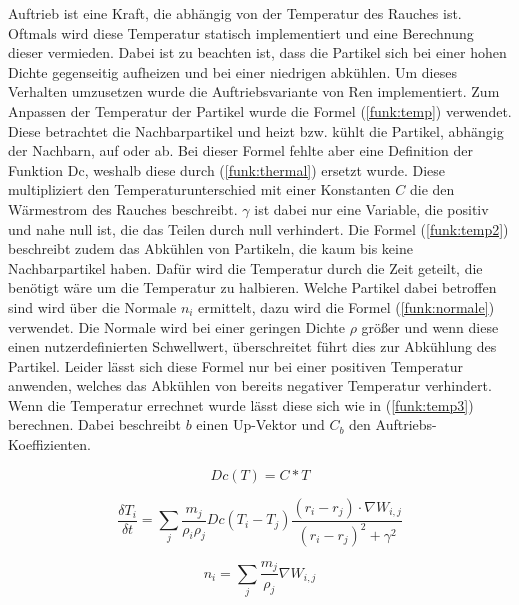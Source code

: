 \documentclass[intern,palatino]{cgBA}
\begin{document}
Auftrieb ist eine Kraft, die abhängig von der Temperatur des Rauches ist. Oftmals wird diese Temperatur statisch implementiert und eine Berechnung dieser vermieden. Dabei ist zu beachten ist, dass die Partikel sich bei einer hohen Dichte gegenseitig aufheizen und bei einer niedrigen abkühlen. Um dieses Verhalten umzusetzen wurde die Auftriebsvariante von Ren \cite{ren2016fast} implementiert.
\newline
Zum Anpassen der Temperatur der Partikel wurde die Formel (\ref{funk:temp}) verwendet. Diese betrachtet die Nachbarpartikel und heizt bzw. kühlt die Partikel, abhängig der Nachbarn, auf oder ab. Bei dieser Formel fehlte aber eine Definition der Funktion Dc, weshalb diese durch (\ref{funk:thermal}) ersetzt wurde. Diese multipliziert den Temperaturunterschied mit einer Konstanten $C$ die den Wärmestrom des Rauches beschreibt. $\gamma$ ist dabei nur eine Variable, die positiv und nahe null ist, die das Teilen durch null verhindert.
\newline
Die Formel (\ref{funk:temp2}) beschreibt zudem das Abkühlen von Partikeln, die kaum bis keine Nachbarpartikel haben. Dafür wird die Temperatur durch die Zeit geteilt, die benötigt wäre um die Temperatur zu halbieren. Welche Partikel dabei betroffen sind wird über die Normale $n_i$ ermittelt, dazu wird die Formel (\ref{funk:normale}) verwendet. Die Normale wird bei einer geringen Dichte $\rho$ größer und wenn diese einen nutzerdefinierten Schwellwert, überschreitet führt dies zur Abkühlung des Partikel. Leider lässt sich diese Formel nur bei einer positiven Temperatur anwenden, welches das Abkühlen von bereits negativer Temperatur verhindert.
\newline
Wenn die Temperatur errechnet wurde lässt diese sich wie in (\ref{funk:temp3}) berechnen. Dabei beschreibt $b$ einen Up-Vektor und $C_b$ den Auftriebs-Koeffizienten.

\begin{equation}\label{funk:thermal}
Dc(T)  = C * T
\end{equation}

\begin{equation}\label{funk:temp}
\frac{\delta T_i}{\delta t}  = \sum_j \frac{m_j}{\rho_i \rho_j} Dc(T_i - T_j) \frac{(r_i-r_j) \cdot \nabla W_{i,j}}{(r_i-r_j)^2 + \gamma^2}
\end{equation}

\begin{equation}\label{funk:normale}
n_i  = \sum_j \frac{m_j}{\rho_j} \nabla W_{i,j}
\end{equation}
\end{document}
